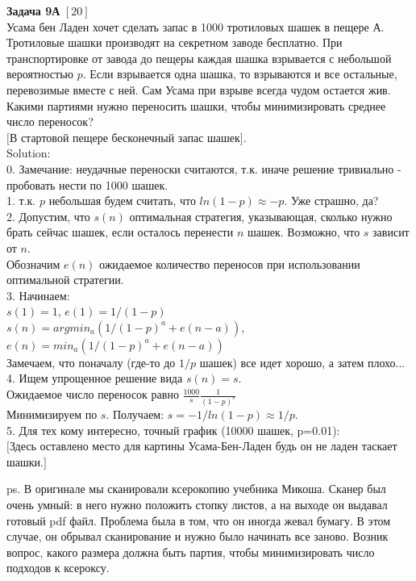 \documentclass[12pt, a4paper]{article}\usepackage[]{graphicx}\usepackage[]{color}
\begin{document}
\textbf{Задача 9А} $[20]$ \\
Усама бен Ладен хочет сделать запас в 1000 тротиловых шашек в пещере А. Тротиловые шашки производят на секретном заводе бесплатно. При транспортировке от завода до пещеры каждая шашка взрывается с небольшой вероятностью $p$. Если взрывается одна шашка, то взрываются и все остальные, перевозимые вместе с ней. Сам Усама при взрыве всегда чудом остается жив. Какими партиями нужно переносить шашки, чтобы минимизировать среднее число переносок? \\
$[$В стартовой пещере бесконечный запас шашек$]$. \\
Solution: \\
0. Замечание: неудачные переноски считаются, т.к. иначе решение тривиально - пробовать нести по 1000 шашек.\\
1. т.к. $p$ небольшая будем считать, что $ln(1-p)\approx -p$. Уже страшно, да? \\
2. Допустим, что $s(n)$ оптимальная стратегия, указывающая, сколько нужно брать сейчас шашек, если осталось перенести $n$ шашек. Возможно, что $s$ зависит от $n$. \\
Обозначим $e(n)$ ожидаемое количество переносов при использовании оптимальной стратегии. \\
3. Начинаем: \\
$s(1)=1$, $e(1)=1/(1-p)$ \\
$s(n)=argmin_{a}(1/(1-p)^{a}+e(n-a))$, $e(n)=min_{a}(1/(1-p)^{a}+e(n-a))$ \\
Замечаем, что поначалу (где-то до $1/p$ шашек) все идет хорошо, а затем плохо... \\
4. Ищем упрощенное решение вида $s(n)=s$. \\
Ожидаемое число переносок равно $\frac{1000}{s}\frac{1}{(1-p)^{s}}$ \\
Минимизируем по $s$. Получаем: $s=-1/ln(1-p)\approx 1/p$. \\
5. Для тех кому интересно, точный график (10000 шашек, p=0.01): \\

$[$Здесь оставлено место для картины Усама-Бен-Ладен будь он не ладен таскает шашки.$]$

ps. В оригинале мы сканировали ксерокопию учебника Микоша. Сканер был очень умный: в него нужно положить стопку листов, а на выходе он выдавал готовый pdf файл. Проблема была в том, что он иногда жевал бумагу. В этом случае, он обрывал сканирование и нужно было начинать все заново. Возник вопрос, какого размера должна быть партия, чтобы минимизировать число подходов к ксероксу.
\end{document}
